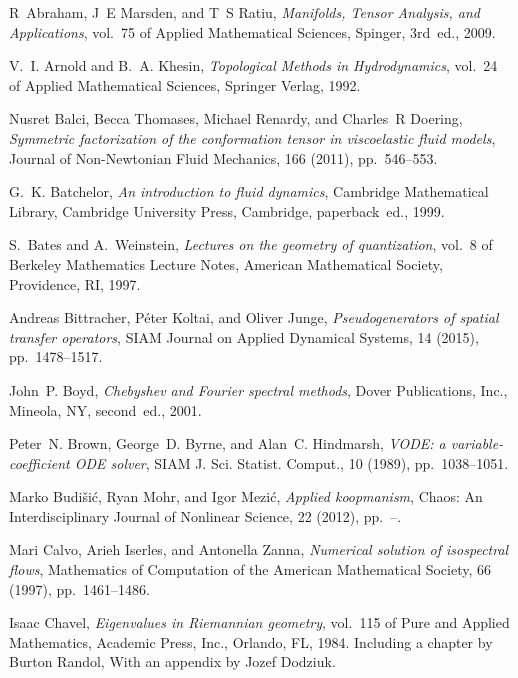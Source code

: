 \documentclass[final,leqno]{amsart}
\begin{document}
\begin{thebibliography}{10}

{\sc R~Abraham, J~E Marsden, and T~S Ratiu}, {\em Manifolds, Tensor Analysis,
  and Applications}, vol.~75 of Applied Mathematical Sciences, Spinger,
  3rd~ed., 2009.

{\sc V.~I. Arnold and B.~A. Khesin}, {\em Topological Methods in
  Hydrodynamics}, vol.~24 of Applied Mathematical Sciences, Springer Verlag,
  1992.

{\sc Nusret Balci, Becca Thomases, Michael Renardy, and Charles~R Doering},
  {\em Symmetric factorization of the conformation tensor in viscoelastic fluid
  models}, Journal of Non-Newtonian Fluid Mechanics, 166 (2011), pp.~546--553.

{\sc G.~K. Batchelor}, {\em An introduction to fluid dynamics}, Cambridge
  Mathematical Library, Cambridge University Press, Cambridge, paperback~ed.,
  1999.

{\sc S.~Bates and A.~Weinstein}, {\em Lectures on the geometry of
  quantization}, vol.~8 of Berkeley Mathematics Lecture Notes, American
  Mathematical Society, Providence, RI, 1997.

{\sc Andreas Bittracher, P{\'e}ter Koltai, and Oliver Junge}, {\em
  Pseudogenerators of spatial transfer operators}, SIAM Journal on Applied
  Dynamical Systems, 14 (2015), pp.~1478--1517.

{\sc John~P. Boyd}, {\em Chebyshev and {F}ourier spectral methods}, Dover
  Publications, Inc., Mineola, NY, second~ed., 2001.

{\sc Peter~N. Brown, George~D. Byrne, and Alan~C. Hindmarsh}, {\em V{ODE}: a
  variable-coefficient {ODE} solver}, SIAM J. Sci. Statist. Comput., 10 (1989),
  pp.~1038--1051.

{\sc Marko Budi{\v s}i{\'c}, Ryan Mohr, and Igor Mezi{\'c}}, {\em Applied
  koopmanism}, Chaos: An Interdisciplinary Journal of Nonlinear Science, 22
  (2012), pp.~--.

{\sc Mari Calvo, Arieh Iserles, and Antonella Zanna}, {\em Numerical solution
  of isospectral flows}, Mathematics of Computation of the American
  Mathematical Society, 66 (1997), pp.~1461--1486.

{\sc Isaac Chavel}, {\em Eigenvalues in {R}iemannian geometry}, vol.~115 of
  Pure and Applied Mathematics, Academic Press, Inc., Orlando, FL, 1984.
\newblock Including a chapter by Burton Randol, With an appendix by Jozef
  Dodziuk.


\end{thebibliography}
\end{document}
